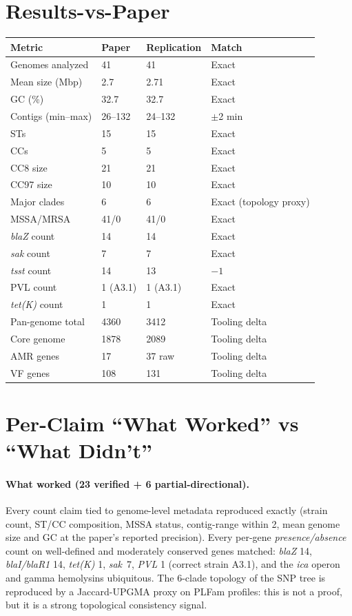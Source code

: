 \documentclass[11pt]{article}
\begin{document}
\section{Results-vs-Paper}
\begin{tabular}{@{}p{5.5cm} p{4cm} p{4cm} p{2cm}@{}}
\toprule
Metric & Paper & Replication & Match \\
\midrule
Genomes analyzed & 41 & 41 & Exact \\
Mean size (Mbp) & 2.7 & 2.71 & Exact \\
GC (\%) & 32.7 & 32.7 & Exact \\
Contigs (min--max) & 26--132 & 24--132 & $\pm$2 min \\
STs & 15 & 15 & Exact \\
CCs & 5 & 5 & Exact \\
CC8 size & 21 & 21 & Exact \\
CC97 size & 10 & 10 & Exact \\
Major clades & 6 & 6 & Exact (topology proxy) \\
MSSA/MRSA & 41/0 & 41/0 & Exact \\
\emph{blaZ} count & 14 & 14 & Exact \\
\emph{sak} count & 7 & 7 & Exact \\
\emph{tsst} count & 14 & 13 & $-1$ \\
PVL count & 1 (A3.1) & 1 (A3.1) & Exact \\
\emph{tet(K)} count & 1 & 1 & Exact \\
Pan-genome total & 4360 & 3412 & Tooling delta \\
Core genome & 1878 & 2089 & Tooling delta \\
AMR genes & 17 & 37 raw & Tooling delta \\
VF genes & 108 & 131 & Tooling delta \\
\bottomrule
\end{tabular}

\section{Per-Claim ``What Worked'' vs ``What Didn't''}
\paragraph{What worked (23 verified + 6 partial-directional).}
Every count claim tied to genome-level metadata reproduced exactly (strain
count, ST/CC composition, MSSA status, contig-range within 2, mean genome
size and GC at the paper's reported precision). Every per-gene
\emph{presence/absence} count on well-defined and moderately conserved genes
matched: \emph{blaZ} 14, \emph{blaI/blaR1} 14, \emph{tet(K)} 1, \emph{sak}~7,
\emph{PVL} 1 (correct strain A3.1), and the \emph{ica} operon and gamma
hemolysins ubiquitous. The 6-clade topology of the SNP tree is reproduced by
a Jaccard-UPGMA proxy on PLFam profiles: this is not a proof, but it is a
strong topological consistency signal.
\end{document}
